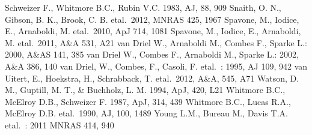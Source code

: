 \documentclass[traditabstract]{aa}
\def\ts     {\thinspace}
\def\etal   {{\rm et\ts al.}~}
\begin{document}
\begin{thebibliography}{}
\bibitem{}Schweizer F., Whitmore B.C., Rubin V.C. 1983, AJ, 88, 909
\bibitem{}Snaith, O. N., Gibson, B. K., Brook, C. B. \etal 2012, MNRAS 425, 1967
\bibitem{}Spavone, M., Iodice, E., Arnaboldi, M. \etal 2010, ApJ 714, 1081
\bibitem{}Spavone, M., Iodice, E., Arnaboldi, M. \etal 2011, A\&A 531, A21
\bibitem{}van Driel W., Arnaboldi M., Combes F.,  Sparke L.: 2000, A\&AS 141, 385
\bibitem{}van Driel W., Combes F., Arnaboldi M., Sparke L.: 2002, A\&A 386, 140 %
\bibitem{}van Driel, W., Combes, F., Casoli, F. \etal: 1995, AJ 109, 942 %
\bibitem{}van Uitert, E., Hoekstra, H., Schrabback, T. \etal 2012, A\&A, 545, A71
\bibitem{}Watson, D. M., Guptill, M. T., \& Buchholz, L. M. 1994, ApJ, 420, L21
\bibitem{}Whitmore B.C., McElroy D.B., Schweizer F. 1987, ApJ, 314, 439
\bibitem{}Whitmore B.C., Lucas R.A., McElroy D.B. \etal 1990, AJ, 100, 1489
\bibitem{}Young L.M., Bureau M., Davis T.A. \etal : 2011 MNRAS 414, 940
\end{thebibliography}
\end{document}
